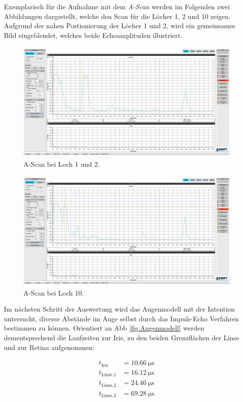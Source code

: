 \noindent Exemplarisch für die Aufnahme mit dem \emph{A-Scan} werden im Folgenden zwei Abbildungen dargestellt, welche den Scan 
für die Löcher 1, 2 und 10 zeigen. Aufgrund der nahen Postionierung der Löcher 1 und 2, wird ein gemeinsames Bild eingeblendet, 
welches beide Echoamplituden illustriert.

\begin{figure}[H]
    \centering
    \includegraphics[height=6cm]{US2_Loch_1_2_top.jpg}
    \caption{A-Scan bei Loch 1 und 2.}
    \label{fig:Loch12}
\end{figure}

\begin{figure}[H]
    \centering 
    \includegraphics[height=6cm]{US2_Loch_10_top.jpg}
    \caption{A-Scan bei Loch 10.}
    \label{fig:Loch10}
\end{figure}

\noindent Im nächsten Schritt der Auswertung wird das Augenmodell mit der Intention untersucht, diverse Abstände im Auge selbst durch 
das Impuls-Echo Verfahren bestimmen zu können. Orientiert an Abb \ref{fig:Augenmodell} werden dementsprechend die Laufzeiten zur Iris, 
zu den beiden Grenzflächen der Linse und zur Retina aufgenommen:

\begin{align*}
    t_\text{Iris} &= \qty{10.66}{\micro\second}    \\ 
    t_\text{Linse,1} &= \qty{16.12}{\micro\second} \\
    t_\text{Linse,2} &= \qty{24.46}{\micro\second} \\
    t_\text{Linse,2} &= \qty{69.28}{\micro\second} \\
\end{align*}

